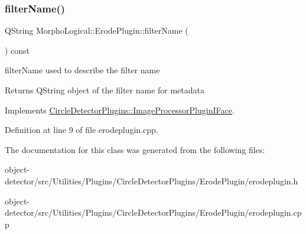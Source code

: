 \mbox{\label{class_morpho_logical_1_1_erode_plugin_a7c3de038d5f2451861c021158c942aab}} 
\subsubsection{\texorpdfstring{filter\+Name()}{filterName()}}
{\footnotesize\ttfamily Q\+String Morpho\+Logical\+::\+Erode\+Plugin\+::filter\+Name (\begin{DoxyParamCaption}{ }\end{DoxyParamCaption}) const\hspace{0.3cm}{\ttfamily [virtual]}}



filter\+Name used to describe the filter name 

\begin{DoxyReturn}{Returns}
Q\+String object of the filter name for metadata 
\end{DoxyReturn}


Implements \hyperlink{class_circle_detector_plugins_1_1_image_processor_plugin_i_face_a278e7f8e8c7e50e566c65202de58d037}{Circle\+Detector\+Plugins\+::\+Image\+Processor\+Plugin\+I\+Face}.



Definition at line 9 of file erodeplugin.\+cpp.



The documentation for this class was generated from the following files\+:\begin{DoxyCompactItemize}
\item 
object-\/detector/src/\+Utilities/\+Plugins/\+Circle\+Detector\+Plugins/\+Erode\+Plugin/erodeplugin.\+h\item 
object-\/detector/src/\+Utilities/\+Plugins/\+Circle\+Detector\+Plugins/\+Erode\+Plugin/erodeplugin.\+cpp\end{DoxyCompactItemize}
